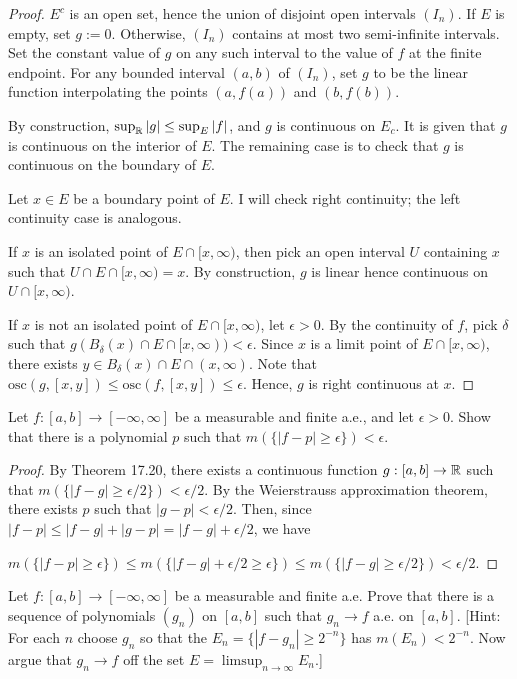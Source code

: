 \documentclass{article}
\newcommand{\osc}{\mathrm{osc}}
\begin{document}
\begin{proof}
$E^c$ is an open set, hence the union of disjoint open intervals $(I_n)$. If $E$ is empty, set $g:= 0$.  Otherwise, $(I_n)$ contains at most two semi-infinite intervals. Set the constant value of $g$ on any such interval to the value of $f$ at the finite endpoint.  For any bounded interval $(a,b)$ of $(I_n)$, set $g$ to be the linear function interpolating the points $(a, f(a))$ and $(b,f(b))$.

By construction, $\sup_{\mathbb{R}} |g| \le \sup_E |f|$, and $g$ is continuous on $E_c$.  It is given that $g$ is continuous on the interior of $E$.  The remaining case is to check that $g$ is continuous on the boundary of $E$.

Let $x \in E$ be a boundary point of $E$.  I will check right continuity; the left continuity case is analogous.

 If $x$ is an isolated point of $E \cap [x, \infty)$, then pick an open interval $U$ containing $x$ such that $U \cap E \cap [x, \infty) = x$.  By construction, $g$ is linear hence continuous on $U \cap [x,\infty)$.

If $x$ is not an isolated point of $E \cap [x, \infty)$, let $\epsilon > 0$. By the continuity of $f$, pick $\delta$ such that $g(B_\delta(x) \cap E \cap [x,\infty)) < \epsilon$. Since $x$ is a limit point of $E \cap [x, \infty)$, there exists $y \in B_\delta(x) \cap E \cap (x,\infty)$. Note that $\osc(g, [x,y]) \le \osc(f, [x,y]) \le \epsilon$. Hence, $g$ is right continuous at $x$.
\end{proof}
 Let $f: [a,b] \to [-\infty,\infty]$ be a measurable and finite a.e., and let $\epsilon > 0$. Show that there is a polynomial $p$ such that  $m(\{|f - p| \ge \epsilon\}) < \epsilon$.
\begin{proof} 
By Theorem 17.20, there exists a continuous function $g:[a,b] \to \mathbb{R}$ such that $m(\{|f - g| \ge \epsilon/2\}) < \epsilon/2$.  By the Weierstrauss approximation theorem, there exists $p$ such that $|g-p| < \epsilon/2$.  Then, 
since $|f - p| \le |f - g| + |g - p| = |f - g| + \epsilon/2$, we have

 $m(\{|f - p| \ge \epsilon\}) \le m(\{|f - g| + \epsilon/2 \ge \epsilon\}) \le m(\{|f - g| \ge \epsilon/2\})  < \epsilon/2.$
\end{proof}
 Let $f: [a,b] \to [-\infty,\infty]$ be a measurable and finite a.e. Prove that there is a sequence of polynomials $(g_n)$ on $[a,b]$ such that $g_n \to f$ a.e. on $[a,b]$. [Hint: For each $n$ choose $g_n$ so that the $E_n = \{|f-g_n| \ge 2^{-n}\}$ has $m(E_n) < 2^{-n}$. Now argue that $g_n \to f$ off the set $E = \limsup_{n\to\infty} E_n$.]
\end{document}
